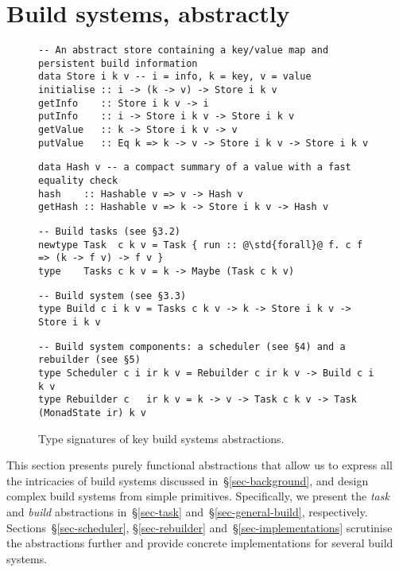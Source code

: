 \section{Build systems, abstractly}\label{sec-abstractions}

\begin{figure}
\begin{verbatim}
-- An abstract store containing a key/value map and persistent build information
data Store i k v -- i = info, k = key, v = value
initialise :: i -> (k -> v) -> Store i k v
getInfo    :: Store i k v -> i
putInfo    :: i -> Store i k v -> Store i k v
getValue   :: k -> Store i k v -> v
putValue   :: Eq k => k -> v -> Store i k v -> Store i k v
\end{verbatim}
\begin{verbatim}
data Hash v -- a compact summary of a value with a fast equality check
hash    :: Hashable v => v -> Hash v
getHash :: Hashable v => k -> Store i k v -> Hash v
\end{verbatim}
\begin{verbatim}
-- Build tasks (see §3.2)
newtype Task  c k v = Task { run :: @\std{forall}@ f. c f => (k -> f v) -> f v }
type    Tasks c k v = k -> Maybe (Task c k v)
\end{verbatim}
\begin{verbatim}
-- Build system (see §3.3)
type Build c i k v = Tasks c k v -> k -> Store i k v -> Store i k v
\end{verbatim}
\begin{verbatim}
-- Build system components: a scheduler (see §4) and a rebuilder (see §5)
type Scheduler c i ir k v = Rebuilder c ir k v -> Build c i k v
type Rebuilder c   ir k v = k -> v -> Task c k v -> Task (MonadState ir) k v
\end{verbatim}
\caption{Type signatures of key build systems abstractions.}\label{fig-types}
\end{figure}

This section presents purely functional abstractions that allow us to express
all the intricacies of build systems discussed in~\S\ref{sec-background},
and design complex build systems from simple primitives. Specifically, we
present the \emph{task} and \emph{build} abstractions in~\S\ref{sec-task}
and~\S\ref{sec-general-build}, respectively. Sections~\S\ref{sec-scheduler},
\S\ref{sec-rebuilder} and~\S\ref{sec-implementations} scrutinise the
abstractions further and provide concrete implementations for several build
systems.

